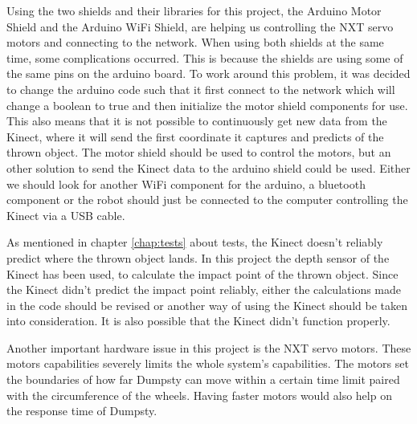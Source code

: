Using the two shields and their libraries for this project, the Arduino Motor Shield and the Arduino WiFi Shield, are helping us controlling the NXT servo motors and connecting to the network. When using both shields at the same time, some complications occurred. This is because the shields are using some of the same pins on the arduino board. To work around this problem, it was decided to change the arduino code such that it first connect to the network which will change a boolean to true and then initialize the motor shield components for use. This also means that it is not possible to continuously get new data from the Kinect, where it will send the first coordinate it captures and predicts of the thrown object. \newline
The motor shield should be used to control the motors, but an other solution to send the Kinect data to the arduino shield could be used. Either we should look for another WiFi component for the arduino, a bluetooth component or the robot should just be connected to the computer controlling the Kinect via a USB cable. 



As mentioned in chapter \ref{chap:tests} about tests, the Kinect doesn’t reliably predict where the thrown object lands. In this project the depth sensor of the Kinect has been used, to calculate the impact point of the thrown object. Since the Kinect didn’t predict the impact point reliably, either the calculations made in the code should be revised or another way of using the Kinect should be taken into consideration. It is also possible that the Kinect didn’t function properly. 


Another important hardware issue in this project is the NXT servo motors. These motors capabilities severely limits the whole system’s capabilities. The motors set the boundaries of how far Dumpsty can move within a certain time limit paired with the circumference of the wheels. Having faster motors would also help on the response time of Dumpsty.


